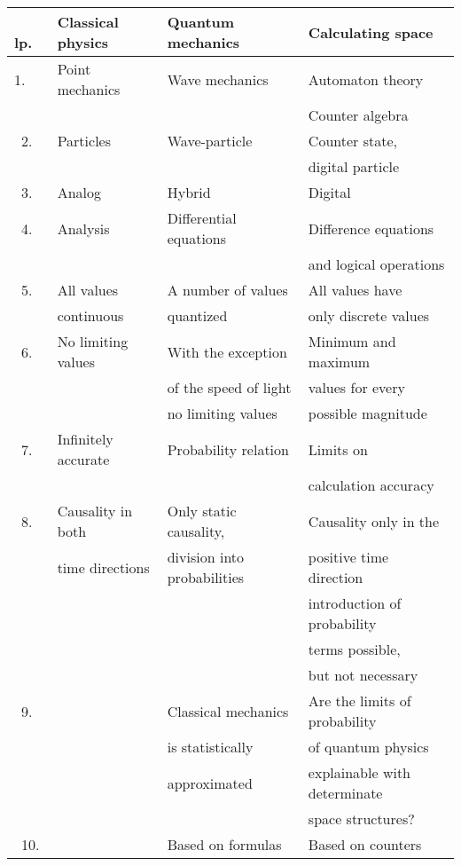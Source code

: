 \documentclass[pdftex,12pt]{article}
\begin{document}
\begin{center}\footnotesize \begin{tabular}{|l|l|l|l|}
  \hline \
   \bf{lp.}& \bf{Classical physics } &  \bf{Quantum mechanics} &  \bf{Calculating space} \\
  \hline\hline
    1.& Point mechanics  & Wave mechanics  & Automaton theory  \\
     &   & & Counter algebra  \\ \hline\
 2.& Particles  & Wave-particle  & Counter state,  \\
 & & & digital particle \\ \hline\
  3.& Analog & Hybrid & Digital \\ \hline\
  4.& Analysis & Differential equations  & Difference equations  \\
  &&& and logical operations \\ \hline\
  5.& All values & A number of values & All values have \\
  &  continuous &  quantized & only discrete values \\  \hline\
  6.& No limiting  values & With the exception   & Minimum and maximum \\
  && of the speed of light  & values for every  \\
  && no limiting values & possible magnitude \\ \hline\
7.&  Infinitely accurate  & Probability relation   & Limits on   \\
&&& calculation accuracy \\ \hline\
8.&  Causality in both & Only static causality,  & Causality only in the \\
 & time directions &   division into probabilities  &  positive time direction  \\
 &&  & introduction of probability \\
  & &  & terms possible, \\
  & & &  but not necessary \\ \hline\
 9.& & Classical mechanics & Are the limits of  probability \\
  & &  is statistically  &  of quantum physics  \\
  &  & approximated &  explainable with determinate\\
  & & &  space structures?\\
   \hline\
 10.& & Based on formulas & Based on counters \\
  \hline
\end{tabular}\end{center}
\end{document}
